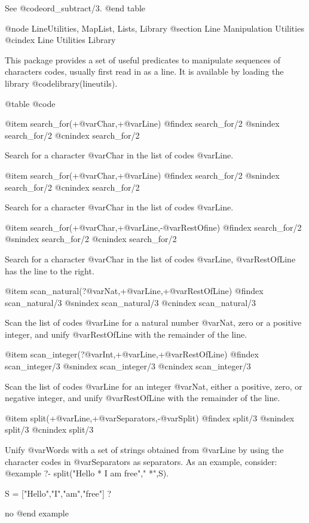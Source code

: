 {{{{{{{{{See @code{ord_subtract/3}.
@end table

@node LineUtilities, MapList, Lists, Library
@section Line Manipulation Utilities
@cindex Line Utilities Library

This package provides a set of useful predicates to manipulate
sequences of characters codes, usually first read in as a line. It is
available by loading the library @code{library(lineutils)}.

@table @code

@item search_for(+@var{Char},+@var{Line})
@findex search_for/2
@snindex search_for/2
@cnindex search_for/2

Search for a character @var{Char} in the list of codes @var{Line}.

@item search_for(+@var{Char},+@var{Line})
@findex search_for/2
@snindex search_for/2
@cnindex search_for/2

Search for a character @var{Char} in the list of codes @var{Line}.

@item search_for(+@var{Char},+@var{Line},-@var{RestOfine})
@findex search_for/2
@snindex search_for/2
@cnindex search_for/2

Search for a character @var{Char} in the list of codes @var{Line},
@var{RestOfLine} has the line to the right.

@item scan_natural(?@var{Nat},+@var{Line},+@var{RestOfLine})
@findex scan_natural/3
@snindex scan_natural/3
@cnindex scan_natural/3

Scan the list of codes @var{Line} for a natural number @var{Nat}, zero
or a positive integer, and unify @var{RestOfLine} with the remainder
of the line.

@item scan_integer(?@var{Int},+@var{Line},+@var{RestOfLine})
@findex scan_integer/3
@snindex scan_integer/3
@cnindex scan_integer/3

Scan the list of codes @var{Line} for an integer @var{Nat}, either a
positive, zero, or negative integer, and unify @var{RestOfLine} with
the remainder of the line.

@item split(+@var{Line},+@var{Separators},-@var{Split})
@findex split/3
@snindex split/3
@cnindex split/3

Unify @var{Words} with a set of strings obtained from @var{Line} by
using the character codes in @var{Separators} as separators. As an
example, consider:
@example
?- split("Hello * I am free"," *",S).

S = ["Hello","I","am","free"] ?

no
@end example

}}}}}}}}}
